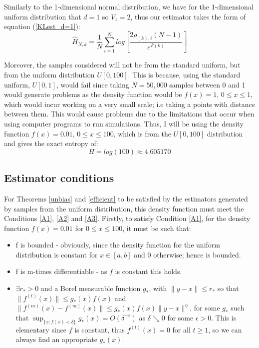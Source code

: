 \documentclass[12pt]{report}
\begin{document}
Similarly to the 1-dimensional normal distribution, we have for the 1-dimensional uniform distribution that $d=1$ so $V_{1} = 2$, thus our estimator takes the form of equation (\ref{KLest_d=1}):
\begin{equation}
\hat{H}_{N, k} =  \frac{1}{N} \sum_{i=1}^{N} log \left[ \frac{2\rho_{(k),i}(N-1)}{e^{\Psi(k)}} \right]\nonumber
\end{equation}

Moreover, the samples considered will not be from the standard uniform, but from the uniform distribution $U[0,100]$. This is because, using the standard uniform, $U[0,1]$, would fail since taking $N=50,000$ samples between 0 and 1 would generate problems as the density function would be $f(x) = 1$, $0 \leq x \leq 1$, which would incur working on a very small scale; i.e taking a points with distance between them. This would cause problems due to the limitations that occur when using computer programs to run simulations. Thus, I will be using the density function $f(x) = 0.01$, $0 \leq x \leq 100$, which is from the $U[0,100]$ distribution and gives the exact entropy of:
\begin{equation} \label{uniform_exact}
H = log(100) \approx 4.605170
\end{equation}




\subsection{Estimator conditions} \label{U_Conditions}

For Theorems \ref{unbias} and \ref{efficient} to be satisfied by the estimators generated by samples from the uniform distribution, this density function must meet the Conditions \ref{A1}, \ref{A2} and \ref{A3}. 
Firstly, to satisfy Condition \ref{A1}, for the density function $f(x) = 0.01$ for $0 \leq x \leq 100$, it must be such that:
\begin{itemize}
\item f is bounded - obviously, since the density function for the uniform distribution is constant for $x \in [a, b]$ and $0$ otherwise; hence is bounded.

\item f is m-times differentiable - as $f$ is constant this holds.

\item $\exists r_{*} > 0$ and a Borel measurable function $g_{*}$, with $\|y-x\| \leq r_{*}$ so that $\|f^{(t)}(x)\| \leq g_{*}(x) f(x)$ and $\|f^{(m)}(x) - f^{(m)}(x)\| \leq g_{*}(x) f(x)\|y - x\|^{\eta}$, for some $g_{*}$ such that $\sup_{\{x : f(x) < \delta\}} g_{*}(x) = O(\delta^{-\epsilon})$ as $\delta \searrow 0$ for some $\epsilon >0$.
This is elementary since $f$ is constant, thus $f^{(t)}(x) = 0$ for all $t \geq 1$, so we can always find an appropriate $g_{*}(x)$.

\end{itemize}
\end{document}
